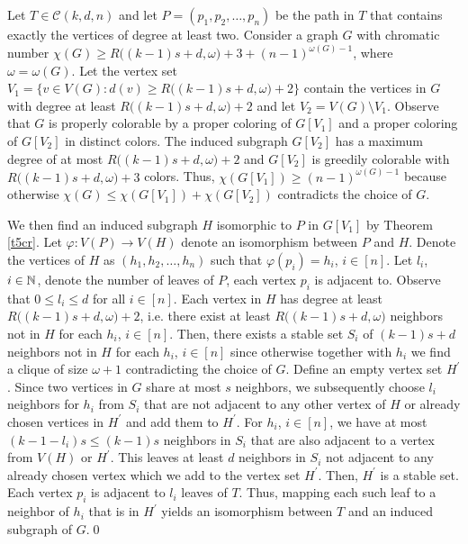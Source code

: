 \begin{prf}
Let $T\in \mathcal{C}(k,d,n)$ and let $P=(p_1,p_2,\dots ,p_n)$ be the path in $T$ that contains exactly the vertices of degree at least two. Consider a graph $G$ with chromatic number $\chi (G)\geq R\big( ( k-1) s+d, \omega \big) +3+ (n-1)^{\omega (G)-1}$, where $\omega =\omega (G)$. Let the vertex set $V_1=\{v\in V(G):d(v)\geq R\big( ( k-1) s+d, \omega \big)+2 \}$ contain the vertices in $G$ with degree at least $R\big( ( k-1) s+d, \omega \big)+2$ and let $V_2=V(G)\setminus V_1$. Observe that $G$ is properly colorable by a proper coloring of $G[V_1]$ and a proper coloring of $G[V_2]$ in distinct colors. The induced subgraph $G[V_2]$ has a maximum degree of at most $R\big( ( k-1) s+d, \omega \big)+2$ and $G[V_2]$ is greedily colorable with $R\big( ( k-1) s+d, \omega \big)+3$ colors. Thus, $\chi (G[V_1])\geq (n-1)^{\omega (G)-1}$ because otherwise $\chi (G)\leq \chi (G[V_1]) +\chi (G[V_2])$ contradicts the choice of $G$.

We then find an induced subgraph $H$ isomorphic to $P$ in $G[V_1]$ by Theorem \ref{t5cr}. Let $\varphi :V(P)\to V(H)$ denote an isomorphism between $P$ and $H$. Denote the vertices of $H$ as $(h_1, h_2,\dots , h_n)$ such that $\varphi (p_i) =h_i$, $i\in [n]$. 
Let $l_i$, $i\in\mathbb{N}$, denote the number of leaves of $P$, each vertex $p_i$ is adjacent to. Observe that $0\leq l_i\leq d$ for all $i\in [n]$.
Each vertex in $H$ has degree at least $R\big( ( k-1) s+d, \omega \big)+2$, i.e. there exist at least $R\big( ( k-1) s+d, \omega \big)$ neighbors not in $H$ for each $h_i$, $i\in [n] $. Then, there exists a stable set $S_i$ of $(k-1)s+d$ neighbors not in $H$ for each $h_i$, $i\in [n] $ since otherwise together with $h_i$ we find a clique of size $\omega +1$ contradicting the choice of $G$. Define an empty vertex set $H^\prime$. Since two vertices in $G$ share at most $s$ neighbors, we subsequently choose $l_i$ neighbors for $h_i$ from $S_i$ that are not adjacent to any other vertex of $H$ or already chosen vertices in $H^\prime$ and add them to $H^\prime$. For $h_i$, $i\in [n]$, we have at most $(k-1-l_i)s\leq (k-1)s$ neighbors in $S_i$ that are also adjacent to a vertex from $V(H)$ or $H^\prime$. This leaves at least $d$ neighbors in $S_i$ not adjacent to any already chosen vertex which we add to the vertex set $H^\prime$. Then, $H^\prime$ is a stable set. Each vertex $p_i$ is adjacent to $l_i$ leaves of $T$. Thus, mapping each such leaf to a neighbor of $h_i$ that is in $H^\prime$ yields an isomorphism between $T$ and an induced subgraph of $G$.\qed
\end{prf}


